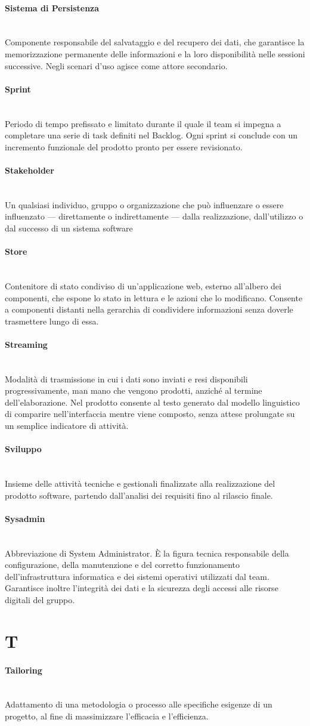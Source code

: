 \documentclass[a4paper, 10pt, colorlinks=true, linkcolor=black, urlcolor=blue, citecolor=blue, hidelinks]{article}
\newcommand{\glossaryterm}[2]{
    \paragraph{#1 \label{term:#1}} \mbox{} \\
    #2
    \vspace{0.5em}
}
\begin{document}
\glossaryterm{Sistema di Persistenza}{Componente responsabile del salvataggio e del recupero dei dati, che garantisce la memorizzazione permanente delle informazioni e la loro disponibilità nelle sessioni successive. Negli scenari d'uso agisce come attore secondario.}

\glossaryterm{Sprint}{Periodo di tempo prefissato e limitato durante il quale il team si impegna a completare una serie di task definiti nel Backlog. Ogni sprint si conclude con un incremento funzionale del prodotto pronto per essere revisionato.}

\glossaryterm{Stakeholder}{Un qualsiasi individuo, gruppo o organizzazione che può influenzare o essere influenzato — direttamente o indirettamente — dalla realizzazione, dall'utilizzo o dal successo di un sistema software}

\glossaryterm{Store}{Contenitore di stato condiviso di un'applicazione web, esterno all'albero dei componenti, che espone lo stato in lettura e le azioni che lo modificano. Consente a componenti distanti nella gerarchia di condividere informazioni senza doverle trasmettere lungo di essa.}

\glossaryterm{Streaming}{Modalità di trasmissione in cui i dati sono inviati e resi disponibili progressivamente, man mano che vengono prodotti, anziché al termine dell'elaborazione. Nel prodotto consente al testo generato dal modello linguistico di comparire nell'interfaccia mentre viene composto, senza attese prolungate su un semplice indicatore di attività.}

\glossaryterm{Sviluppo}{Insieme delle attività tecniche e gestionali finalizzate alla realizzazione del prodotto software, partendo dall'analisi dei requisiti fino al rilascio finale.}

\glossaryterm{Sysadmin}{Abbreviazione di System Administrator. È la figura tecnica responsabile della configurazione, della manutenzione e del corretto funzionamento dell'infrastruttura informatica e dei sistemi operativi utilizzati dal team. Garantisce inoltre l'integrità dei dati e la sicurezza degli accessi alle risorse digitali del gruppo.}

\newpage

\section*{T}

\glossaryterm{Tailoring}{Adattamento di una metodologia o processo alle specifiche esigenze di un progetto, al fine di massimizzare l'efficacia e l'efficienza.}
\end{document}
